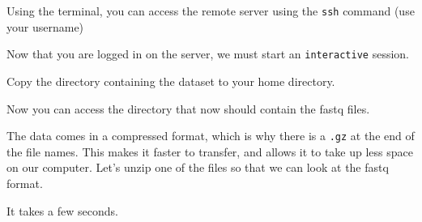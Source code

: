 \documentclass[
  letterpaper,
  DIV=11,
  numbers=noendperiod]{scrreprt}
\newenvironment{Shaded}{\begin{snugshade}}{\end{snugshade}}
\newcommand{\AttributeTok}[1]{\textcolor[rgb]{0.40,0.45,0.13}{#1}}
\newcommand{\ExtensionTok}[1]{\textcolor[rgb]{0.00,0.23,0.31}{#1}}
\newcommand{\NormalTok}[1]{\textcolor[rgb]{0.00,0.23,0.31}{#1}}
\newcommand{\PreprocessorTok}[1]{\textcolor[rgb]{0.68,0.00,0.00}{#1}}
\newcommand{\SpecialStringTok}[1]{\textcolor[rgb]{0.13,0.47,0.30}{#1}}
\begin{document}
Using the terminal, you can access the remote server using the
\texttt{ssh} command (use your username)

\begin{Shaded}
\end{Shaded}

Now that you are logged in on the server, we must start an
\texttt{interactive} session.

\begin{Shaded}
\end{Shaded}

Copy the directory containing the dataset to your home directory.

\begin{Shaded}
\end{Shaded}

Now you can access the directory that now should contain the fastq
files.

\begin{Shaded}
\end{Shaded}

The data comes in a compressed format, which is why there is a
\texttt{.gz} at the end of the file names. This makes it faster to
transfer, and allows it to take up less space on our computer. Let's
unzip one of the files so that we can look at the fastq format.

\begin{Shaded}
\end{Shaded}

It takes a few seconds.
\end{document}

